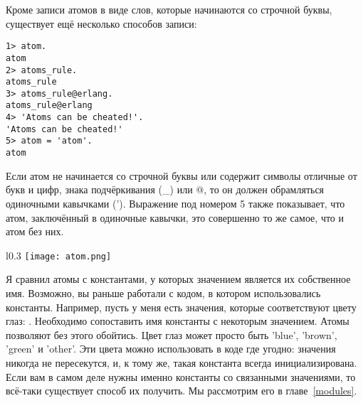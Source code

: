 Кроме записи атомов в виде слов, которые начинаются со строчной буквы, существует ещё несколько способов записи:
\begin{lstlisting}[style=repl]
1> atom.
atom
2> atoms_rule.
atoms_rule
3> atoms_rule@erlang.
atoms_rule@erlang
4> 'Atoms can be cheated!'.
'Atoms can be cheated!'
5> atom = 'atom'.
atom
\end{lstlisting}

Если атом не начинается со строчной буквы или содержит символы отличные от букв и цифр, знака подчёркивания (\_) или @, то он должен обрамляться одиночными кавычками (').
Выражение под номером 5 также показывает, что атом, заключённый в одиночные кавычки, это совершенно то же самое, что и атом без них.

\begin{wrapfigure}{l}{0.3\linewidth}
    \texttt{[image: atom.png]}
\end{wrapfigure}
Я сравнил атомы с константами, у которых значением является их собственное имя.
Возможно, вы раньше работали с кодом, в котором использовались константы.
Например, пусть у меня есть значения, которые соответствуют цвету глаз:  .
Необходимо сопоставить имя константы с некоторым значением.
Атомы позволяют без этого обойтись.
Цвет глаз может просто быть 'blue', 'brown', 'green' и 'other'.
Эти цвета можно использовать в коде где угодно: значения никогда не пересекутся, и, к тому же, такая константа всегда инициализирована.
Если вам в самом деле нужны именно константы со связанными значениями, то всё\--таки существует способ их получить.
Мы рассмотрим его в главе~\ref{modules}.

